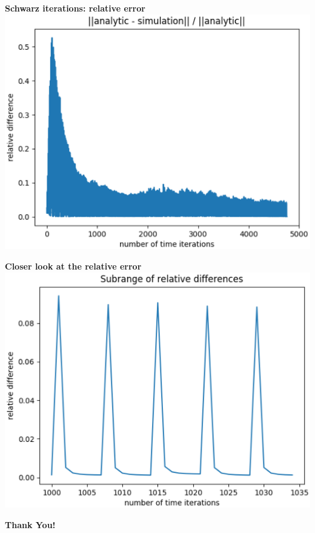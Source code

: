 \documentclass[12pt]{beamer}
\newcommand{\myTitle}{\rmfamily\bfseries}
\begin{document}
\begin{frame}{\myTitle Schwarz iterations: relative error}
\includegraphics[height=0.9\textheight,keepaspectratio]{images/schwarz-diff.eps}
\end{frame}

\begin{frame}{\myTitle Closer look at the relative error}
\includegraphics[height=0.9\textheight,keepaspectratio]{images/schwarz-diff-subrange.eps}
\end{frame}

\begin{frame}{}
\centerline{\LARGE \bf Thank You!}
\end{frame}
\end{document}
